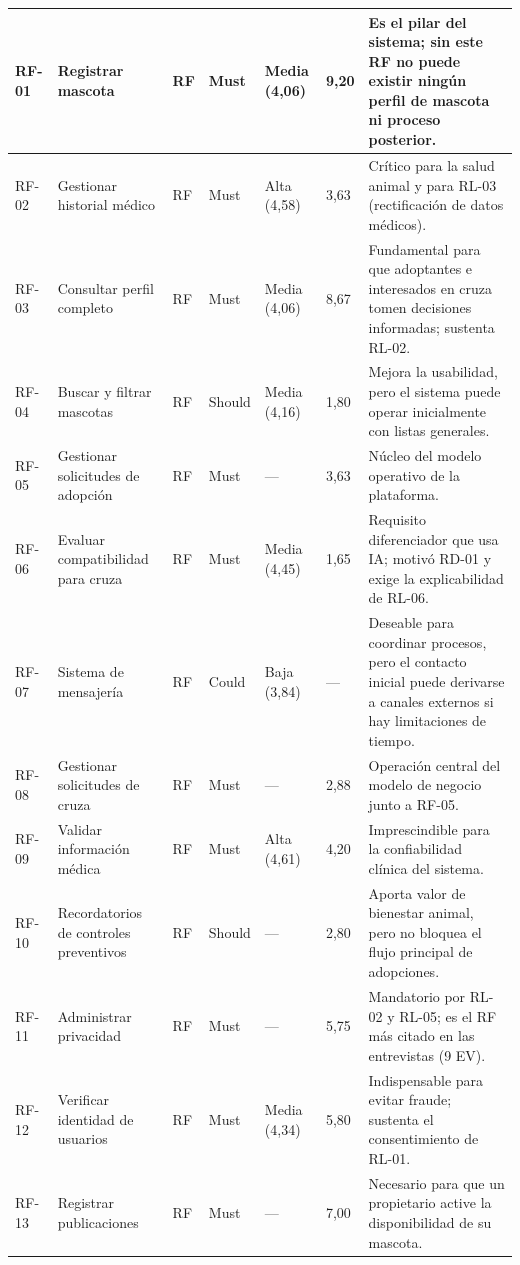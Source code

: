 \documentclass[journal,onecolumn]{IEEEtran}
\begin{document}
\begin{landscape}
\begin{longtable}{@{}p{1.2cm} p{5.2cm} p{1.0cm} p{1.3cm} p{1.3cm} p{1.1cm} p{6.5cm}@{}}
			RF-01 & Registrar mascota & RF & Must & Media (4,06) & 9,20 & Es el pilar del sistema; sin este RF no puede existir ningún perfil de mascota ni proceso posterior. \\ \midrule
			RF-02 & Gestionar historial médico & RF & Must & Alta (4,58) & 3,63 & Crítico para la salud animal y para RL-03 (rectificación de datos médicos). \\ \midrule
			RF-03 & Consultar perfil completo & RF & Must & Media (4,06) & 8,67 & Fundamental para que adoptantes e interesados en cruza tomen decisiones informadas; sustenta RL-02. \\ \midrule
			RF-04 & Buscar y filtrar mascotas & RF & Should & Media (4,16) & 1,80 & Mejora la usabilidad, pero el sistema puede operar inicialmente con listas generales. \\ \midrule
			RF-05 & Gestionar solicitudes de adopción & RF & Must & --- & 3,63 & Núcleo del modelo operativo de la plataforma. \\ \midrule
			RF-06 & Evaluar compatibilidad para cruza & RF & Must & Media (4,45) & 1,65 & Requisito diferenciador que usa IA; motivó RD-01 y exige la explicabilidad de RL-06. \\ \midrule
			RF-07 & Sistema de mensajería & RF & Could & Baja (3,84) & --- & Deseable para coordinar procesos, pero el contacto inicial puede derivarse a canales externos si hay limitaciones de tiempo. \\ \midrule
			RF-08 & Gestionar solicitudes de cruza & RF & Must & --- & 2,88 & Operación central del modelo de negocio junto a RF-05. \\ \midrule
			RF-09 & Validar información médica & RF & Must & Alta (4,61) & 4,20 & Imprescindible para la confiabilidad clínica del sistema. \\ \midrule
			RF-10 & Recordatorios de controles preventivos & RF & Should & --- & 2,80 & Aporta valor de bienestar animal, pero no bloquea el flujo principal de adopciones. \\ \midrule
			RF-11 & Administrar privacidad & RF & Must & --- & 5,75 & Mandatorio por RL-02 y RL-05; es el RF más citado en las entrevistas (9 EV). \\ \midrule
			RF-12 & Verificar identidad de usuarios & RF & Must & Media (4,34) & 5,80 & Indispensable para evitar fraude; sustenta el consentimiento de RL-01. \\ \midrule
			RF-13 & Registrar publicaciones & RF & Must & --- & 7,00 & Necesario para que un propietario active la disponibilidad de su mascota. \\ \midrule

\end{longtable}
\end{landscape}
\end{document}
